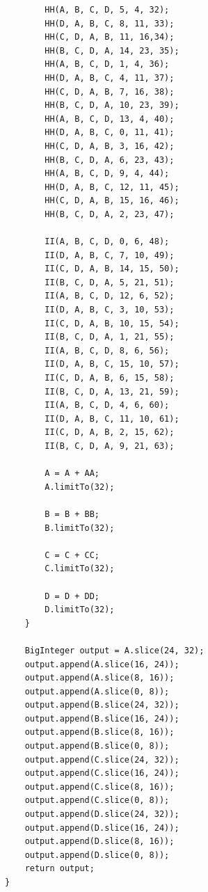 \begin{prove}
\begin{verbatim}
        HH(A, B, C, D, 5, 4, 32);
        HH(D, A, B, C, 8, 11, 33);
        HH(C, D, A, B, 11, 16,34);
        HH(B, C, D, A, 14, 23, 35);
        HH(A, B, C, D, 1, 4, 36);
        HH(D, A, B, C, 4, 11, 37);
        HH(C, D, A, B, 7, 16, 38);
        HH(B, C, D, A, 10, 23, 39);
        HH(A, B, C, D, 13, 4, 40);
        HH(D, A, B, C, 0, 11, 41);
        HH(C, D, A, B, 3, 16, 42);
        HH(B, C, D, A, 6, 23, 43);
        HH(A, B, C, D, 9, 4, 44);
        HH(D, A, B, C, 12, 11, 45);
        HH(C, D, A, B, 15, 16, 46);
        HH(B, C, D, A, 2, 23, 47);
        
        II(A, B, C, D, 0, 6, 48);
        II(D, A, B, C, 7, 10, 49);
        II(C, D, A, B, 14, 15, 50);
        II(B, C, D, A, 5, 21, 51);
        II(A, B, C, D, 12, 6, 52);
        II(D, A, B, C, 3, 10, 53);
        II(C, D, A, B, 10, 15, 54);
        II(B, C, D, A, 1, 21, 55);
        II(A, B, C, D, 8, 6, 56);
        II(D, A, B, C, 15, 10, 57);
        II(C, D, A, B, 6, 15, 58);
        II(B, C, D, A, 13, 21, 59);
        II(A, B, C, D, 4, 6, 60);
        II(D, A, B, C, 11, 10, 61);
        II(C, D, A, B, 2, 15, 62);
        II(B, C, D, A, 9, 21, 63);
        
        A = A + AA;
        A.limitTo(32);
        
        B = B + BB;
        B.limitTo(32);
        
        C = C + CC;
        C.limitTo(32);
        
        D = D + DD;
        D.limitTo(32);
    }
    
    BigInteger output = A.slice(24, 32);
    output.append(A.slice(16, 24));
    output.append(A.slice(8, 16));
    output.append(A.slice(0, 8));
    output.append(B.slice(24, 32));
    output.append(B.slice(16, 24));
    output.append(B.slice(8, 16));
    output.append(B.slice(0, 8));
    output.append(C.slice(24, 32));
    output.append(C.slice(16, 24));
    output.append(C.slice(8, 16));
    output.append(C.slice(0, 8));
    output.append(D.slice(24, 32));
    output.append(D.slice(16, 24));
    output.append(D.slice(8, 16));
    output.append(D.slice(0, 8));
    return output;
}
\end{verbatim}
\end{prove}